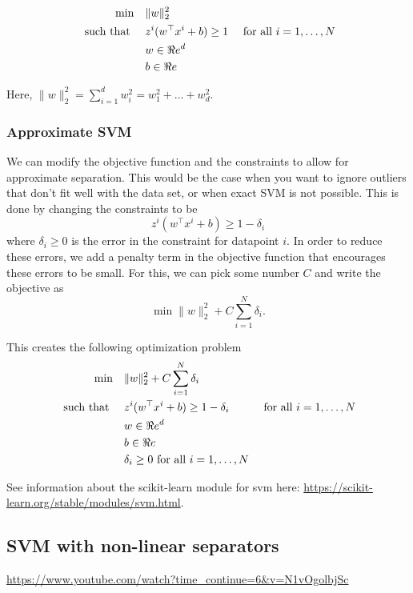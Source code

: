 \begin{align*}
\min \quad & \|w\|_2^2 \\
\mbox{ such that } \quad & z^i( w^\top x^i + b) \geq 1 & \mbox{ for all } i=1, \dots, N\\
& w  \in \Re e^d\\
& b \in \Re e
\end{align*}

Here, $\|w\|_2^2 = \sum_{i=1}^d w_i^2 = w_1^2 + \dots + w_d^2$.


\subsubsection{Approximate SVM}
We can modify the objective function and the constraints to allow for approximate separation.  This would be the case when you want to ignore outliers that don't fit well with the data set, or when exact SVM is not possible.  This is done by changing the constraints to be 
$$
z^i( w^\top x^i + b) \geq 1 - \delta_i
$$
where $\delta_i\geq 0$ is the error in the constraint for datapoint $i$.  In order to reduce these errors, we add a penalty term in the objective function that encourages these errors to be small.  For this, we can pick some number $C$ and write the objective as 
$$
\min  \|w\|_2^2  + C \sum_{i=1}^N \delta_i.
$$

This creates the following optimization problem
\begin{align*}
\min \quad & \|w\|_2^2+ C \sum_{i=1}^N \delta_i \\
\mbox{ such that } \quad & z^i( w^\top x^i + b) \geq 1  - \delta_i& \mbox{ for all } i=1, \dots, N\\
& w  \in \Re e^d\\
& b \in \Re e\\
& \delta_i \geq 0  \mbox{ for all } i =1, \dots, N
\end{align*}


See information about the scikit-learn module for svm here:
\url{https://scikit-learn.org/stable/modules/svm.html}.

\subsection{SVM with non-linear separators}



\begin{resource}
\url{https://www.youtube.com/watch?time_continue=6&v=N1vOgolbjSc}
\end{resource}




